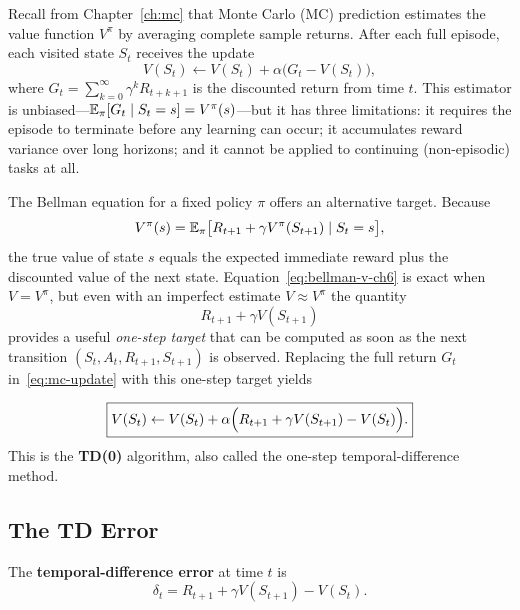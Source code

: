 Recall from Chapter~\ref{ch:mc} that Monte Carlo (MC) prediction estimates the value function $V^\pi$ by averaging complete sample returns.  After each full episode, each visited state $S_t$ receives the update
\begin{equation}
\label{eq:mc-update}
V(S_t) \leftarrow V(S_t) + \alpha\bigl(G_t - V(S_t)\bigr),
\end{equation}
where $G_t = \sum_{k=0}^{\infty}\gamma^k R_{t+k+1}$ is the discounted return from time $t$.  This estimator is unbiased---$\operatorname{\mathbb{E}}_\pi[G_t \mid S_t = s] = V^\pi(s)$---but it has three limitations: it requires the episode to terminate before any learning can occur; it accumulates reward variance over long horizons; and it cannot be applied to continuing (non-episodic) tasks at all.

The Bellman equation for a fixed policy $\pi$ offers an alternative target.  Because
\begin{equation}
\label{eq:bellman-v-ch6}
V^\pi(s) = \operatorname{\mathbb{E}}_\pi\bigl[R_{t+1} + \gamma V^\pi(S_{t+1}) \mid S_t = s\bigr],
\end{equation}
the true value of state $s$ equals the expected immediate reward plus the discounted value of the next state.  Equation~\eqref{eq:bellman-v-ch6} is exact when $V = V^\pi$, but even with an imperfect estimate $V \approx V^\pi$ the quantity
\begin{equation}
\label{eq:td0-target}
R_{t+1} + \gamma V(S_{t+1})
\end{equation}
provides a useful \emph{one-step target} that can be computed as soon as the next transition $(S_t, A_t, R_{t+1}, S_{t+1})$ is observed.  Replacing the full return $G_t$ in~\eqref{eq:mc-update} with this one-step target yields

\begin{equation}
\label{eq:td0-update}
\boxed{V(S_t) \leftarrow V(S_t) + \alpha\Bigl(R_{t+1} + \gamma V(S_{t+1}) - V(S_t)\Bigr).}
\end{equation}
This is the \textbf{TD(0)} algorithm, also called the one-step temporal-difference method.

\subsection{The TD Error}

\begin{definition}[TD error]
\label{def:td-error}
The \textbf{temporal-difference error} at time $t$ is
\begin{equation}
\label{eq:td-error}
\delta_t = R_{t+1} + \gamma V(S_{t+1}) - V(S_t).
\end{equation}
\end{definition}

